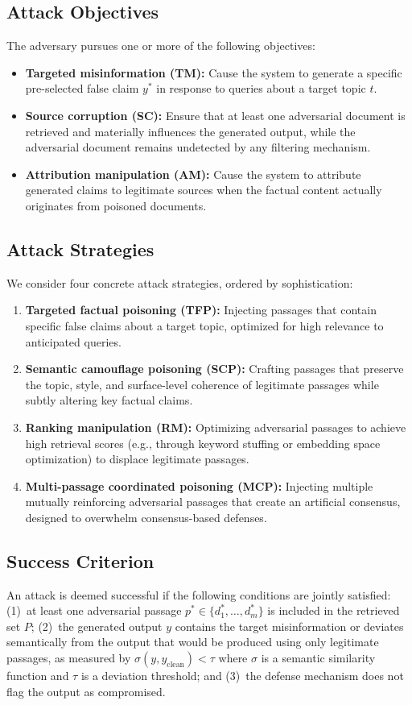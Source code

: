 \documentclass[journal,10pt]{IEEEtran}
\begin{document}
\subsection{Attack Objectives}
The adversary pursues one or more of the following objectives:
\begin{itemize}[leftmargin=*]
\item \textbf{Targeted misinformation (TM):} Cause the system to generate a specific pre-selected false claim $y^*$ in response to queries about a target topic $t$.
\item \textbf{Source corruption (SC):} Ensure that at least one adversarial document is retrieved and materially influences the generated output, while the adversarial document remains undetected by any filtering mechanism.
\item \textbf{Attribution manipulation (AM):} Cause the system to attribute generated claims to legitimate sources when the factual content actually originates from poisoned documents.
\end{itemize}

\subsection{Attack Strategies}
We consider four concrete attack strategies, ordered by sophistication:
\begin{enumerate}[leftmargin=*]
\item \textbf{Targeted factual poisoning (TFP):} Injecting passages that contain specific false claims about a target topic, optimized for high relevance to anticipated queries.
\item \textbf{Semantic camouflage poisoning (SCP):} Crafting passages that preserve the topic, style, and surface-level coherence of legitimate passages while subtly altering key factual claims.
\item \textbf{Ranking manipulation (RM):} Optimizing adversarial passages to achieve high retrieval scores (e.g., through keyword stuffing or embedding space optimization) to displace legitimate passages.
\item \textbf{Multi-passage coordinated poisoning (MCP):} Injecting multiple mutually reinforcing adversarial passages that create an artificial consensus, designed to overwhelm consensus-based defenses.
\end{enumerate}

\subsection{Success Criterion}
An attack is deemed successful if the following conditions are jointly satisfied: (1)~at least one adversarial passage $p^* \in \{d_1^*, \ldots, d_m^*\}$ is included in the retrieved set $P$; (2)~the generated output $y$ contains the target misinformation or deviates semantically from the output that would be produced using only legitimate passages, as measured by $\sigma(y, y_{\text{clean}}) < \tau$ where $\sigma$ is a semantic similarity function and $\tau$ is a deviation threshold; and (3)~the defense mechanism does not flag the output as compromised.
\end{document}
